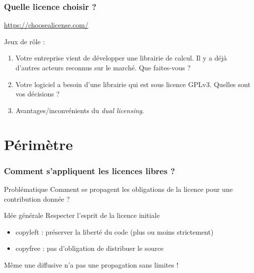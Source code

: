 \documentclass{beamer}
\begin{document}
\begin{frame}
  \frametitle{Quelle licence choisir ?}
  
  \url{https://choosealicense.com/}

  Jeux de rôle :
  \begin{enumerate}
  \item Votre entreprise vient de développer une librairie de calcul. Il y a déjà d'autres acteurs reconnus sur le marché. Que faites-vous ?
  \item Votre logiciel a besoin d'une librairie qui est sous licence GPLv3. Quelles sont vos décisions ?
  \item Avantages/inconvénients du \textit{dual licensing}.
  \end{enumerate}
\end{frame}


\section{Périmètre}


\begin{frame}\frametitle{Comment s'appliquent les licences libres ?}
  \begin{alertblock}{Problématique}
    Comment se propagent les obligations de la licence pour une
    contribution donnée ?
  \end{alertblock}

  \begin{block}{Idée générale}
    Respecter l'esprit de la licence initiale
  \end{block}

  \begin{itemize}
  \item copyleft : préserver la liberté du code (plus ou moins
    strictement)
  \item copyfree : pas d'obligation de distribuer le source
  \end{itemize}

  Même une diffusive n'a pas une propagation sans limites !
  
\end{frame}
\end{document}
